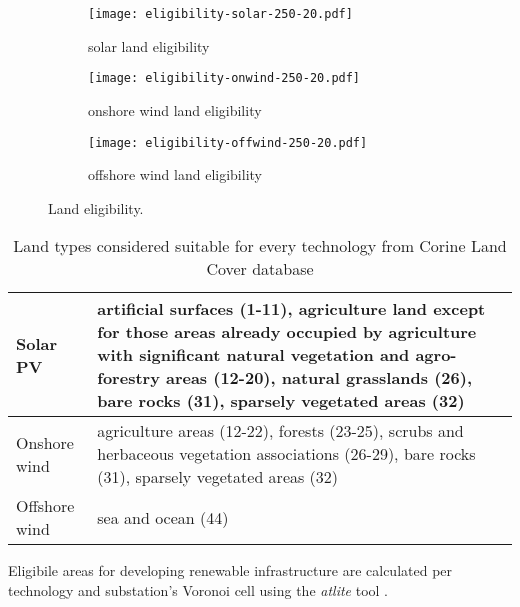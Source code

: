 \begin{landscape}

\begin{figure}
    \centering
    \begin{subfigure}[t]{0.5\textwidth}
            \centering
        \caption{solar land eligibility}
        \texttt{[image: eligibility-solar-250-20.pdf]}
    \end{subfigure}
    \begin{subfigure}[t]{0.5\textwidth}
        \centering
        \caption{onshore wind land eligibility}
        \texttt{[image: eligibility-onwind-250-20.pdf]}
    \end{subfigure}
    \begin{subfigure}[t]{0.5\textwidth}
        \centering
        \caption{offshore wind land eligibility}
        \texttt{[image: eligibility-offwind-250-20.pdf]}
    \end{subfigure}
    \caption{Land eligibility.}
    \label{fig:eligibility}
\end{figure}


\end{landscape}
\restoregeometry


\begin{table}
    \caption{Land types considered suitable for every technology from Corine Land Cover database}
    \small
    \begin{tabularx}{\textwidth}{lX}
        \toprule
        Solar PV & artificial surfaces (1-11), agriculture land except for those
        areas already occupied by agriculture with significant natural
        vegetation and agro-forestry areas (12-20), natural grasslands (26), bare rocks (31),
        sparsely vegetated areas (32) \\ \midrule
        Onshore wind & agriculture areas (12-22), forests (23-25), scrubs and herbaceous vegetation associations (26-29), bare rocks (31), sparsely vegetated areas (32) \\ \midrule
        Offshore wind & sea and ocean (44) \\ \bottomrule
    \end{tabularx}
    \label{tab:eligibility}
\end{table}

Eligibile areas for developing renewable infrastructure are calculated per technology and substation's Voronoi cell using the \textit{atlite} tool \citeS{}.


